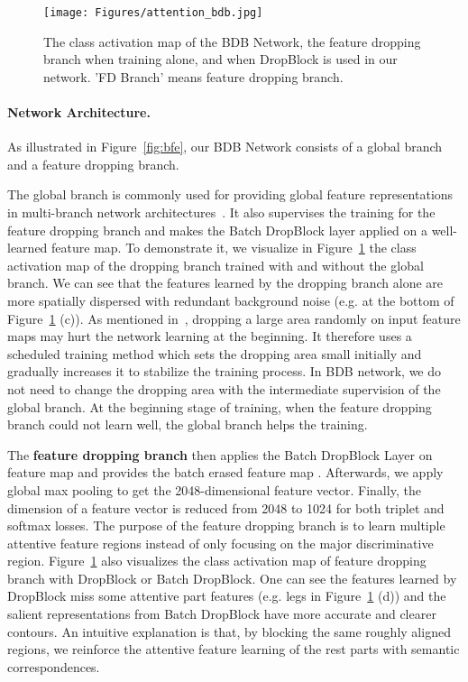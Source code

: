 \documentclass[10pt,twocolumn,letterpaper]{article}
\begin{document}
\begin{figure}[t]
\texttt{[image: Figures/attention\_bdb.jpg]}
\vspace{-6mm}
\caption{The class activation map of the BDB Network, the feature dropping branch when training alone, and when DropBlock is used in our network. 'FD Branch' means feature dropping branch.}
\label{fig:attention_bdb}
\vspace{3mm}
\end{figure}

\paragraph{Network Architecture.}\vspace{-3mm}
As illustrated in Figure~\ref{fig:bfe}, our BDB Network consists of a global branch and a feature dropping branch.

The global branch is commonly used for providing global feature representations in multi-branch network architectures~\cite{cheng2016person, sun2017beyond, wang2018mgn}.
It also supervises the training for the feature dropping branch and makes the Batch DropBlock layer applied on a well-learned feature map. 
To demonstrate it, we visualize in Figure~\ref{fig:attention_bdb} the class activation map of the dropping branch trained with and without the global branch. We can see that the features learned by the dropping branch alone are more spatially dispersed with redundant background noise (e.g. at the bottom of Figure~\ref{fig:attention_bdb} (c)). 
As mentioned in~\cite{ghiasi2018dropblock}, dropping a large area randomly on input feature maps may hurt the network learning at the beginning. It therefore uses a scheduled training method which sets the dropping area small initially and gradually increases it to stabilize the training process. In BDB network, we do not need to change the dropping area with the intermediate supervision of the global branch. 
At the beginning stage of training, when the feature dropping branch could not learn well, the global branch helps the training. 


The {\bf feature dropping branch} then applies the Batch DropBlock Layer on feature map  and provides the batch erased feature map . Afterwards, we apply global max pooling to get the 2048-dimensional feature vector. Finally, the dimension of a feature vector is reduced from 2048 to 1024  for both triplet and softmax losses. The purpose of the feature dropping branch is to learn multiple attentive feature regions instead of only focusing on the major discriminative region. Figure~\ref{fig:attention_bdb} also visualizes the class activation map of feature dropping branch with DropBlock or Batch DropBlock. One can see the features learned by DropBlock miss some attentive part features (e.g. legs in Figure~\ref{fig:attention_bdb} (d)) and the salient representations from Batch DropBlock have more accurate and clearer contours.
An intuitive explanation is that, by blocking the same roughly aligned regions, we reinforce the attentive feature learning of the rest parts with semantic correspondences.
\end{document}
